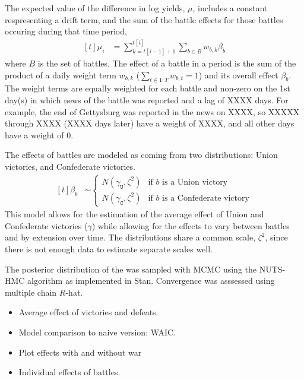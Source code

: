 The expected value of the difference in log yields, $\mu$, includes a constant respresenting a drift term, and the sum of the battle effects for those battles occuring during that time period,
\begin{equation}
  \label{bonds_battles:eq:2}
  \begin{aligned}[t]
    \mu_{i} &= \sum_{k = t[i-1] + 1}^{t[i]} \sum_{b \in B} w_{b,k} \beta_{b}
  \end{aligned}
\end{equation}
where $B$ is the set of battles.
The effect of a battle in a period is the sum of the product of a daily weight term $w_{b,k}$ ($\sum_{t \in 1:T} w_{b,t} = 1$) and its overall effect $\beta_{b}$.
The weight terms are equally weighted for each battle and non-zero on the 1st day(s) in which news of the battle was reported and a lag of XXXX days.
For example, the end of Gettysburg was reported in the news on XXXX, so XXXXX through XXXX (XXXX days later) have a weight of XXXX, and all other days have a weight of 0.

The effects of battles are modeled as coming from two distributions: Union victories, and Confederate victories.
\begin{equation}
  \label{bonds_battles:eq:4}
  \begin{aligned}[t]
  \beta_{b} &\sim
  \begin{cases}
    N(\gamma_{\mathtt{U}}, \zeta^{2}) & \text{if $b$ is a Union victory} \\
    N(\gamma_{\mathtt{C}}, \zeta^{2}) & \text{if $b$ is a Confederate victory}
  \end{cases}
  \end{aligned}
\end{equation}
This model allows for the estimation of the average effect of Union and Confederate victories ($\gamma$) while allowing for the effects to vary between battles and by extension over time.
The distributions share a common scale, $\zeta^{2}$, since there is not enough data to estimate separate scales well.

The posterior distribution of the was sampled with MCMC using the NUTS-HMC algorithm as implemented in Stan.
Convergence was asssessed using multiple chain $R$-hat.

\begin{itemize}
\item Average effect of victories and defeats.
\item Model comparison to naive version: WAIC.
\item Plot effects with and without war
\item Individual effects of battles.
\end{itemize}

